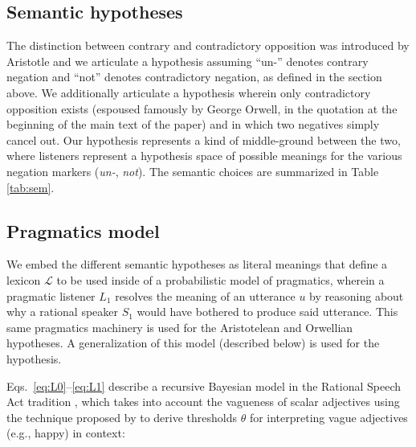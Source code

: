 \documentclass[floatsintext,doc]{apa6}
\begin{document}


\subsection{Semantic hypotheses}

The distinction between contrary and contradictory opposition was introduced by Aristotle and we articulate a hypothesis assuming ``un-'' denotes contrary negation and ``not'' denotes contradictory negation, as defined in the section above.
We additionally articulate a hypothesis wherein only contradictory opposition exists (espoused famously by George Orwell, in the quotation at the beginning of the main text of the paper) and in which two negatives simply cancel out. 
Our \ourmodel hypothesis represents a kind of middle-ground between the two, where listeners represent a hypothesis space of possible meanings for the various negation markers (\emph{un-}, \emph{not}).
The semantic choices are summarized in Table \ref{tab:sem}.

\subsection{Pragmatics model}

We embed the different semantic hypotheses as literal meanings that define a lexicon $\mathcal{L}$ to be used inside of a probabilistic model of pragmatics, wherein a pragmatic listener $L_1$ resolves the meaning of an utterance $u$ by reasoning about why a rational speaker $S_1$ would have bothered to produce said utterance.
This same pragmatics machinery is used for the Aristotelean and Orwellian hypotheses. 
A generalization of this model (described below) is used for the \ourmodel hypothesis. 

Eqs.~\ref{eq:L0}--\ref{eq:L1} describe a recursive Bayesian model in the Rational Speech Act tradition \cite{Franke2015a, Goodman2016:RSA}, 
which takes into account the vagueness of scalar adjectives using the technique proposed by  to derive thresholds \(\theta\) for interpreting vague adjectives (e.g., happy) in context:
\end{document}
